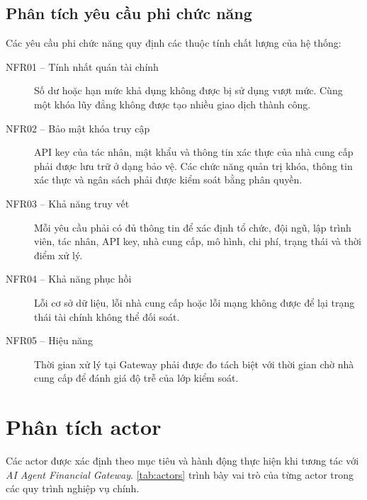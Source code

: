 
\subsection*{Phân tích yêu cầu phi chức năng}

Các yêu cầu phi chức năng quy định các thuộc tính chất lượng của hệ thống:

\begin{description}
    \item[NFR01 -- Tính nhất quán tài chính] Số dư hoặc hạn mức khả dụng không được bị sử dụng vượt mức. Cùng một khóa lũy đẳng không được tạo nhiều giao dịch thành công.
    \item[NFR02 -- Bảo mật khóa truy cập] API key của tác nhân, mật khẩu và thông tin xác thực của nhà cung cấp phải được lưu trữ ở dạng bảo vệ. Các chức năng quản trị khóa, thông tin xác thực và ngân sách phải được kiểm soát bằng phân quyền.
    \item[NFR03 -- Khả năng truy vết] Mỗi yêu cầu phải có đủ thông tin để xác định tổ chức, đội ngũ, lập trình viên, tác nhân, API key, nhà cung cấp, mô hình, chi phí, trạng thái và thời điểm xử lý.
    \item[NFR04 -- Khả năng phục hồi] Lỗi cơ sở dữ liệu, lỗi nhà cung cấp hoặc lỗi mạng không được để lại trạng thái tài chính không thể đối soát.
    \item[NFR05 -- Hiệu năng] Thời gian xử lý tại Gateway phải được đo tách biệt với thời gian chờ nhà cung cấp để đánh giá độ trễ của lớp kiểm soát.
\end{description}

\section{Phân tích actor}

Các actor được xác định theo mục tiêu và hành động thực hiện khi tương tác với \textit{AI Agent Financial Gateway}. \cref{tab:actors} trình bày vai trò của từng actor trong các quy trình nghiệp vụ chính.

